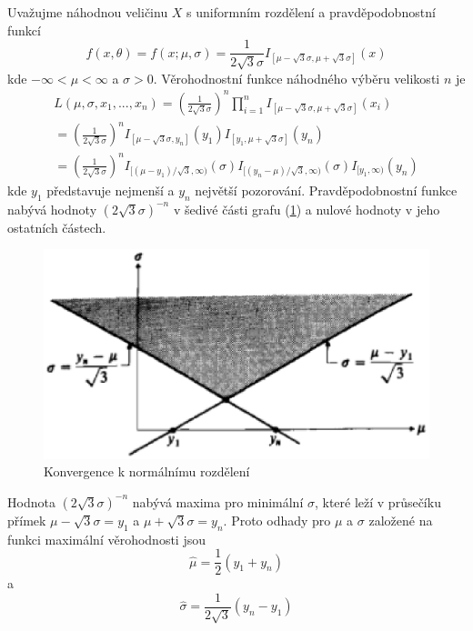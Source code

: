 \begin{example}
Uvažujme náhodnou veličinu $X$ s uniformním rozdělení a pravděpodobnostní funkcí
\begin{equation*}
f(x, \theta) = f(x; \mu, \sigma) = \frac{1}{2 \sqrt{3} \sigma}I_{[\mu - \sqrt{3}\sigma, \mu + \sqrt{3}\sigma]}(x)
\end{equation*}
kde $-\infty < \mu < \infty$ a $\sigma > 0$. Věrohodnostní funkce náhodného výběru velikosti $n$ je
\begin{gather*}
L(\mu, \sigma, x_1, ..., x_n) = \left(\frac{1}{2 \sqrt{3} \sigma}\right)^n \prod_{i = 1}^n I_{[\mu - \sqrt{3} \sigma, \mu + \sqrt{3} \sigma]}(x_i)\\
= \left(\frac{1}{2 \sqrt{3}\sigma}\right)^n I_{[\mu - \sqrt{3} \sigma, y_n]}(y_1)I_{[y_1, \mu + \sqrt{3}\sigma]}(y_n)\\
= \left(\frac{1}{2 \sqrt{3} \sigma}\right)^n I_{[(\mu - y_1)/ \sqrt{3}, \infty)}(\sigma)I_{[(y_n - \mu)/\sqrt{3}, \infty)}(\sigma)I_{[y_1, \infty)}(y_n)
\end{gather*}
kde $y_1$ představuje nejmenší a $y_n$ největší pozorování. Pravděpodobnostní funkce nabývá hodnoty $(2 \sqrt{3} \sigma)^{-n}$ v šedivé části grafu (\ref{uniform-illustration}) a nulové hodnoty v jeho ostatních částech.

\begin{figure}[htp]
\centering
\includegraphics[scale = 0.5]{pictures/uniform_illustration.eps}
\caption{Konvergence k normálnímu rozdělení}
\label{uniform-illustration}
\end{figure}

Hodnota $(2 \sqrt{3} \sigma)^{-n}$ nabývá maxima pro minimální $\sigma$, které leží v průsečíku přímek $\mu - \sqrt{3} \sigma = y_1$ a $\mu + \sqrt{3} \sigma = y_n$. Proto odhady pro $\mu$ a $\sigma$ založené na funkci maximální věrohodnosti jsou
\begin{equation*}
\hat{\mu} = \frac{1}{2}(y_1 + y_n)
\end{equation*}
a
\begin{equation*}
\hat{\sigma} = \frac{1}{2 \sqrt{3}}(y_n - y_1)
\end{equation*}
\end{example}

